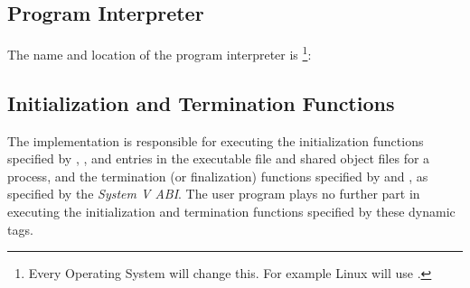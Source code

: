 \subsection{Program Interpreter}

The name and location of the program interpreter  is%
\footnote{Every Operating System will change this.
  For example Linux will use .}:

\bigskip
{}

\subsection{Initialization and Termination Functions}

The implementation is responsible for executing the initialization
functions specified by ,  , and
 entries in the executable file and shared
object files for a process, and the termination (or finalization)
functions specified by  and , as
specified by the \textit{System V ABI}.  The user program plays no
further part in executing the initialization and termination functions
specified by these dynamic tags.


